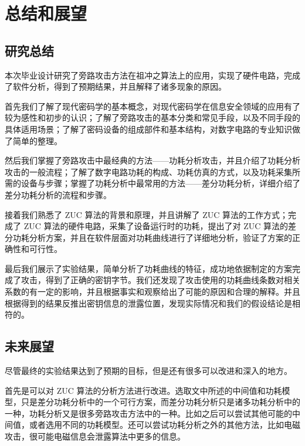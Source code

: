 
\chapter{总结和展望}

\label{chap:conclusion}

\section{研究总结}

本次毕业设计研究了旁路攻击方法在祖冲之算法上的应用，实现了硬件电路，完成了软件分析，得到了预期结果，并且解释了诸多现象的原因。


首先我们了解了现代密码学的基本概念，对现代密码学在信息安全领域的应用有了较为感性和初步的认识；了解了旁路攻击的基本分类和常见手段，以及不同手段的具体适用场景；了解了密码设备的组成部件和基本结构，对数字电路的专业知识做了简单的整理。

然后我们掌握了旁路攻击中最经典的方法——功耗分析攻击，并且介绍了功耗分析攻击的一般流程；了解了数字电路功耗的构成、功耗仿真的方式，以及功耗采集所需的设备与步骤；掌握了功耗分析中最常用的方法——差分功耗分析，详细介绍了差分功耗分析的流程和步骤。

接着我们熟悉了 ZUC 算法的背景和原理，并且讲解了 ZUC 算法的工作方式；完成了 ZUC 算法的硬件电路，采集了设备运行时的功耗，提出了对 ZUC 算法的差分功耗分析方案，并且在软件层面对功耗曲线进行了详细地分析，验证了方案的正确性和可行性。

最后我们展示了实验结果，简单分析了功耗曲线的特征，成功地依据制定的方案完成了攻击，得到了正确的密钥字节。我们还发现了攻击使用的功耗曲线条数对相关系数的有一定的影响，并且根据事实和观察给出了可能的原因和合理的解释。并且根据得到的结果反推出密钥信息的泄露位置，发现实际情况和我们的假设结论是相符的。

\section{未来展望}

尽管最终的实验结果达到了预期的目标，但是还有很多可以改进和深入的地方。

首先是可以对 ZUC 算法的分析方法进行改进。选取文中所述的中间值和功耗模型，只是差分功耗分析中的一个可行方案，而差分功耗分析只是诸多功耗分析中的一种，功耗分析又是很多旁路攻击方法中的一种。比如之后可以尝试其他可能的中间值，或者选用不同的功耗模型。还可以尝试功耗分析之外的其他方法，比如电磁攻击，很可能电磁信息会泄露算法中更多的信息。

